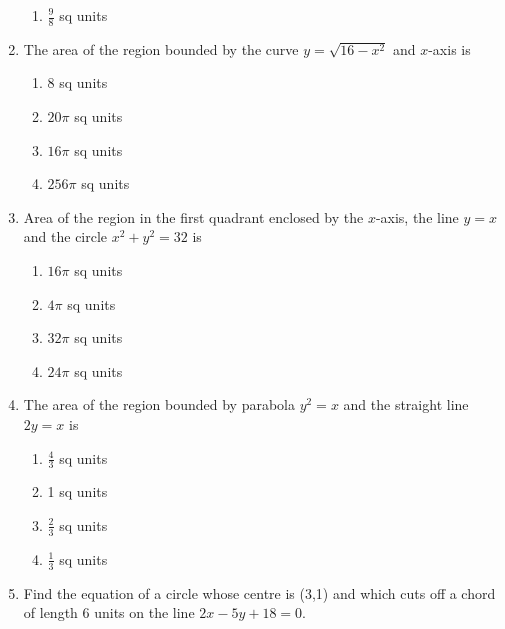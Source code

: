 \begin{enumerate}[label=\thesubsection.\arabic*,ref=\thesubsection.\theenumi]
\begin{enumerate}
\item $\frac{9}{8}$ sq units
\end{enumerate}
\item The area of the region bounded by the curve $y = \sqrt{16 - x^2}$ and $x$-axis is 
\begin{enumerate}
\item 8 sq units 
\item ${20\pi}$ sq units
\item ${16\pi}$ sq units
\item ${256\pi}$ sq units
\end{enumerate}
\item Area of the region in the first quadrant enclosed by the $x$-axis, the line $y = x$ and the circle $x^2 + y^2 = 32$ is 
\begin{enumerate}
\item ${16\pi}$ sq units 
\item ${4\pi}$ sq units
\item ${32\pi}$ sq units
\item ${24\pi}$ sq units
\end{enumerate}
\item The area of the region bounded by parabola $y^2 = x$ and the straight line $2y = x$ is
\begin{enumerate}
\item $\frac{4}{3}$ sq units
\item 1 sq units
\item $\frac{2}{3}$ sq units 
\item $\frac{1}{3}$ sq units
\end{enumerate}
\item Find the equation of a circle whose centre is (3,1) and which cuts off a chord of length  6 units on the  line $2x-5y+18=0$.
\end{enumerate}
